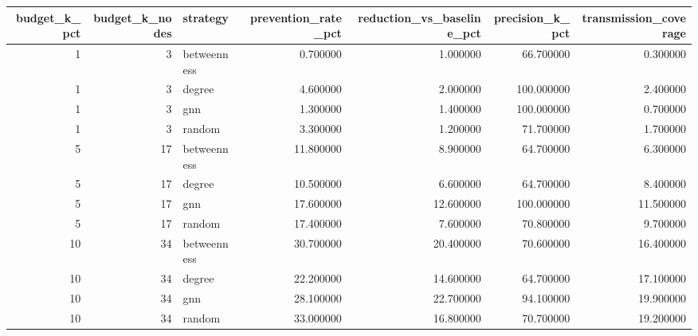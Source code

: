 \begin{tabular}{rrlrrrr}
\toprule
budget\_k\_pct & budget\_k\_nodes & strategy & prevention\_rate\_pct & reduction\_vs\_baseline\_pct & precision\_k\_pct & transmission\_coverage \\
\midrule
1 & 3 & betweenness & 0.700000 & 1.000000 & 66.700000 & 0.300000 \\
1 & 3 & degree & 4.600000 & 2.000000 & 100.000000 & 2.400000 \\
1 & 3 & gnn & 1.300000 & 1.400000 & 100.000000 & 0.700000 \\
1 & 3 & random & 3.300000 & 1.200000 & 71.700000 & 1.700000 \\
5 & 17 & betweenness & 11.800000 & 8.900000 & 64.700000 & 6.300000 \\
5 & 17 & degree & 10.500000 & 6.600000 & 64.700000 & 8.400000 \\
5 & 17 & gnn & 17.600000 & 12.600000 & 100.000000 & 11.500000 \\
5 & 17 & random & 17.400000 & 7.600000 & 70.800000 & 9.700000 \\
10 & 34 & betweenness & 30.700000 & 20.400000 & 70.600000 & 16.400000 \\
10 & 34 & degree & 22.200000 & 14.600000 & 64.700000 & 17.100000 \\
10 & 34 & gnn & 28.100000 & 22.700000 & 94.100000 & 19.900000 \\
10 & 34 & random & 33.000000 & 16.800000 & 70.700000 & 19.200000 \\
\bottomrule
\end{tabular}
